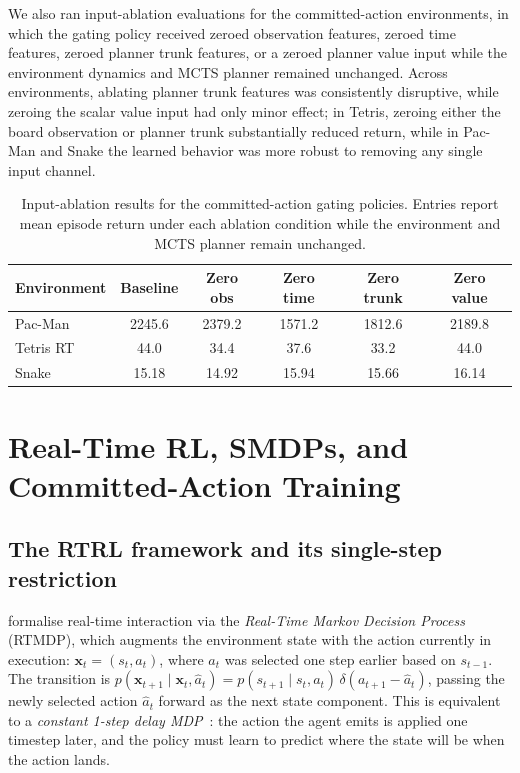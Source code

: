 We also ran input-ablation evaluations for the committed-action environments, in
which the gating policy received zeroed observation features, zeroed time
features, zeroed planner trunk features, or a zeroed planner value input while
the environment dynamics and MCTS planner remained unchanged.
Across environments, ablating planner trunk features was consistently
disruptive, while zeroing the scalar value input had only minor effect; in
Tetris, zeroing either the board observation or planner trunk substantially
reduced return, while in Pac-Man and Snake the learned behavior was more robust
to removing any single input channel.

\begin{table}[h]
  \centering
  \small
  \setlength{\tabcolsep}{6pt}
  \begin{tabular}{lccccc}
    \toprule
    Environment & Baseline & Zero obs & Zero time & Zero trunk & Zero value \\
    \midrule
    Pac-Man   & 2245.6 & 2379.2 & 1571.2 & 1812.6 & 2189.8 \\
    Tetris RT &   44.0 &   34.4 &   37.6 &   33.2 &   44.0 \\
    Snake     &   15.18 &  14.92 &  15.94 &  15.66 &  16.14 \\
    \bottomrule
  \end{tabular}
  \caption{
    Input-ablation results for the committed-action gating policies.
    Entries report mean episode return under each ablation condition while the
    environment and MCTS planner remain unchanged.}
\end{table}


\section{Real-Time RL, SMDPs, and Committed-Action Training}
\label{app:rtrl_smdp}

\subsection*{The RTRL framework and its single-step restriction}

\citet{ramstedt2019rtrl} formalise real-time interaction via the
\emph{Real-Time Markov Decision Process} (RTMDP), which augments the environment
state with the action currently in execution:
$\mathbf{x}_t = (s_t, a_t)$,
where $a_t$ was selected one step earlier based on $s_{t-1}$.
The transition is
$p(\mathbf{x}_{t+1} \mid \mathbf{x}_t, \hat{a}_t) =
 p(s_{t+1} \mid s_t, a_t)\,\delta(a_{t+1} - \hat{a}_t)$,
passing the newly selected action $\hat{a}_t$ forward as the next state component.
This is equivalent to a \emph{constant 1-step delay MDP}~\citep{walsh2009delayed}:
the action the agent emits is applied one timestep later, and the policy must
learn to predict where the state will be when the action lands.

